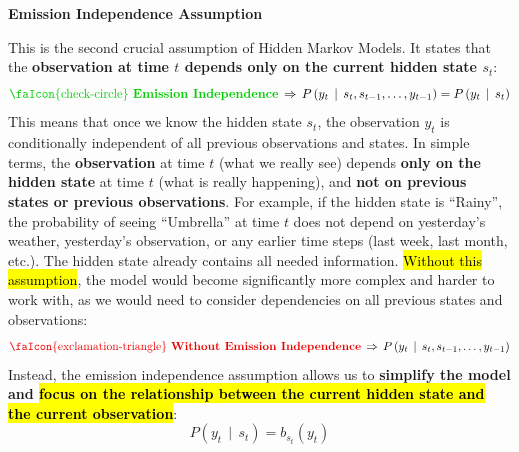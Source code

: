 \begin{enumerate}
    \begin{flushleft}
        \textcolor{DarkOrange3}{ \textbf{Emission Independence Assumption}}
    \end{flushleft}
    This is the second crucial assumption of Hidden Markov Models. It states that the \textbf{observation at time $t$ depends only on the current hidden state $s_t$}:
    \begin{equation*}
        \textcolor{Green3}{\text{\faIcon{check-circle} } \textbf{Emission Independence}} \, \Rightarrow \, P\left(y_t \, \mid \, s_{t}, s_{t-1}, \dots, y_{t-1}\right) = P\left(y_t \, \mid \, s_t\right)
    \end{equation*}
    This means that once we know the hidden state $s_t$, the observation $y_t$ is conditionally independent of all previous observations and states. In simple terms, the \textbf{observation} at time $t$ (what we really see) depends \textbf{only on the hidden state} at time $t$ (what is really happening), and \textbf{not on previous states or previous observations}. For example, if the hidden state is ``Rainy'', the probability of seeing ``Umbrella'' at time $t$ does not depend on yesterday's weather, yesterday's observation, or any earlier time steps (last week, last month, etc.). The hidden state already contains all needed information. \hl{Without this assumption}, the model would become significantly more complex and harder to work with, as we would need to consider dependencies on all previous states and observations:
    \begin{equation*}
        \textcolor{Red2}{\text{\faIcon{exclamation-triangle} } \textbf{Without Emission Independence}} \, \Rightarrow \, P\left(y_t \, \mid \, s_{t}, s_{t-1}, \dots, y_{t-1}\right)
    \end{equation*}
    Instead, the emission independence assumption allows us to \textbf{simplify the model and \hl{focus on the relationship between the current hidden state and the current observation}}:
    \begin{equation*}
        P\left(y_t \, \mid \, s_t\right) = b_{s_t}(y_t)
    \end{equation*}
\end{enumerate}

